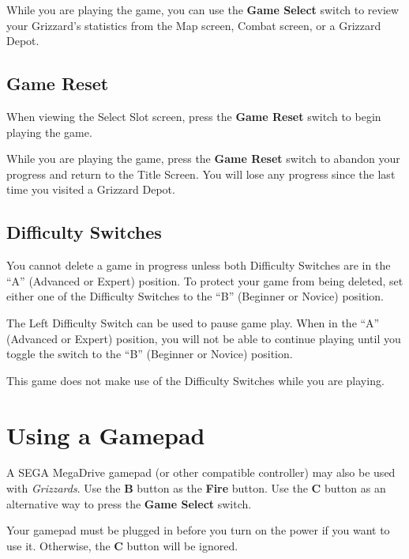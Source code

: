 \documentclass[10pt,twocolumn,openany,article]{memoir}
\begin{document}
While you  are playing the  game, you  can use the  \textbf{Game Select}
switch to review your Grizzard's  statistics from the Map screen, Combat
screen, or a Grizzard Depot.

\subsection{Game Reset}

When  viewing the  Select  Slot screen,  press  the \textbf{Game  Reset}
switch to begin playing the game.

While you are playing the game,  press the \textbf{Game Reset} switch to
abandon your progress and return to  the Title Screen. You will lose any
progress since the last time you visited a Grizzard Depot.

\subsection{Difficulty Switches}

You cannot delete a game in progress unless both Difficulty Switches are
in the  ``A'' (Advanced or Expert)  position. To protect your  game from
being deleted,  set either one of  the Difficulty Switches to  the ``B''
(Beginner or Novice) position.

\ifdefined\TVSECAM

The Left Difficulty Switch  can be used to pause game  play. When in the
``A'' (Advanced  or Expert) position, you  will not be able  to continue
playing  until  you  toggle  the   switch  to  the  ``B''  (Beginner  or
Novice) position.

\else

This  game does  not  make  use of  the  Difficulty  Switches while  you
are playing. 

\fi

\section{Using a Gamepad}

A   SEGA  \ifdefined{}\fi{}MegaDrive   gamepad  (or   other
compatible controller) may also be used with \textit{Grizzards}. Use the
\textbf{B} button  as the \textbf{Fire} button.  Use the \textbf{C} button  as an
alternative way to press the \textbf{Game Select} switch.

Your gamepad must be plugged in before you turn on the power if you want
to use it. Otherwise, the \textbf{C} button will be ignored.
\end{document}

